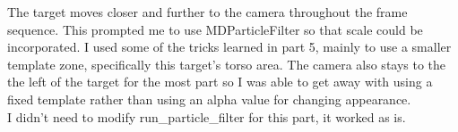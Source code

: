 The target moves closer and further to the camera throughout the frame sequence. This prompted me to use MDParticleFilter so that scale could be incorporated. I used some of the tricks learned in part 5, mainly to use a smaller template zone, specifically this target's torso area. The camera also stays to the the left of the target for the most part so I was able to get away with using a fixed template rather than using an alpha value for changing appearance.\\

I didn't need to modify run\_particle\_filter for this part, it worked as is.
